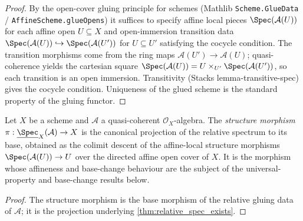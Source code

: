 \begin{proof}
  
  
\leanok
  By the open-cover gluing principle for schemes (Mathlib
  \texttt{Scheme.GlueData} / \texttt{AffineScheme.glueOpens}) it suffices to specify
  affine local pieces \(\Spec(\mathcal{A}(U))\) for each affine open \(U \subseteq X\) and
  open-immersion transition data
  \(\Spec(\mathcal{A}(U)) \hookrightarrow \Spec(\mathcal{A}(U'))\) for \(U \subseteq U'\)
  satisfying the cocycle condition. The transition morphisms come from the ring maps
  \(\mathcal{A}(U') \to \mathcal{A}(U)\); quasi-coherence yields the cartesian square
  \(\Spec(\mathcal{A}(U)) = U \times_{U'} \Spec(\mathcal{A}(U'))\), so each transition is an
  open immersion. Transitivity (Stacks lemma-transitive-spec) gives the cocycle condition.
  Uniqueness of the glued scheme is the standard property of the gluing functor.
\end{proof}

\begin{definition}

  \label{def:relspec_structure_morphism}
  Let \(X\) be a scheme and \(\mathcal{A}\) a quasi-coherent \(\mathcal{O}_X\)-algebra.
  The \emph{structure morphism}
  \(\pi : \underline{\Spec}_X(\mathcal{A}) \to X\) is the canonical projection of the
  relative spectrum to its base, obtained as the colimit descent of the affine-local
  structure morphisms \(\Spec(\mathcal{A}(U)) \to U\) over the directed affine open
  cover of \(X\). It is the morphism whose affineness and base-change behaviour are the
  subject of the universal-property and base-change results below.
\end{definition}

\begin{proof}

\leanok
  The structure morphism is the base morphism of the relative gluing data of
  \(\mathcal{A}\); it is the projection underlying \cref{thm:relative_spec_exists}.
\end{proof}

